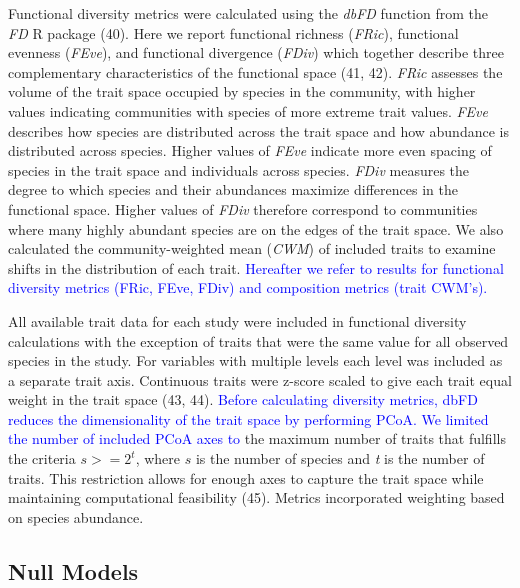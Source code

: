 \documentclass{article}
\begin{document}
Functional diversity metrics were calculated using the \emph{dbFD}
function from the \emph{FD} R package (40). Here we report functional
richness (\emph{FRic}), functional evenness (\emph{FEve}), and
functional divergence (\emph{FDiv}) which together describe three
complementary characteristics of the functional space (41, 42).
\emph{FRic} assesses the volume of the trait space occupied by species
in the community, with higher values indicating communities with species
of more extreme trait values. \emph{FEve} describes how species are
distributed across the trait space and how abundance is distributed
across species. Higher values of \emph{FEve} indicate more even spacing
of species in the trait space and individuals across species.
\emph{FDiv} measures the degree to which species and their abundances
maximize differences in the functional space. Higher values of
\emph{FDiv} therefore correspond to communities where many highly
abundant species are on the edges of the trait space. We also calculated
the community-weighted mean (\emph{CWM}) of included traits to examine
shifts in the distribution of each trait.
\textcolor{blue}{Hereafter we refer to results for functional diversity metrics (FRic, FEve, FDiv) and composition metrics (trait CWM's).}

All available trait data for each study were included in functional
diversity calculations with the exception of traits that were the same
value for all observed species in the study. For variables with multiple
levels each level was included as a separate trait axis. Continuous
traits were z-score scaled to give each trait equal weight in the trait
space (43, 44).
\textcolor{blue}{Before calculating diversity metrics, dbFD reduces the dimensionality of the trait space by performing PCoA. We limited the number of included PCoA axes to}
the maximum number of traits that fulfills the criteria \(s >= 2^t\),
where \(s\) is the number of species and \emph{t} is the number of
traits. This restriction allows for enough axes to capture the trait
space while maintaining computational feasibility (45). Metrics
incorporated weighting based on species abundance.

\hypertarget{null-models}{%
\subsection{Null Models}\label{null-models}}
\end{document}
